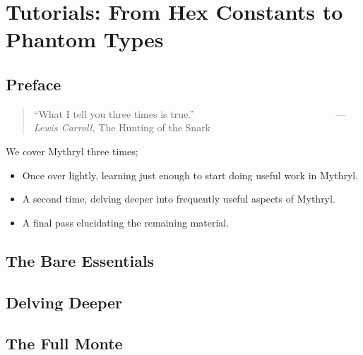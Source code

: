 \chapter{Tutorials: From Hex Constants to Phantom Types}

%
%

\section{Preface}

\begin{quote}\begin{tiny}
       ``What I tell you three times is true.''\newline
         ~~~~~~~~~~~~~~~~~~~~~~~~~~~~---{\em Lewis Carroll,} The Hunting of the Snark
\end{tiny}\end{quote}

We cover Mythryl three times;
\begin{itemize}
\item Once over lightly, learning just enough to start doing useful work in Mythryl.
\item A second time, delving deeper into frequently useful aspects of Mythryl.
\item A final pass elucidating the remaining material.
\end{itemize}


\section{The Bare Essentials}

\cutend*


\section{Delving Deeper}

\cutend*

\section{The Full Monte}

\cutend*


